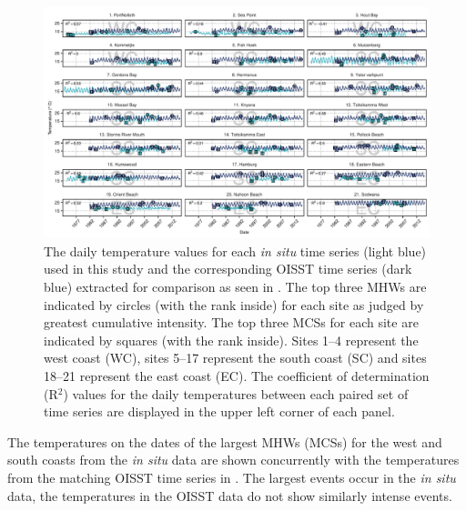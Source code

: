 \documentclass[a4paper,10pt,review]{elsarticle}
\begin{document}
\begin{figure}
\centering
\includegraphics[width=1.0\textwidth]{figure2.pdf}
\caption{The daily temperature values for each \emph{in situ} time series (light blue) used in this study and the corresponding OISST time series (dark blue) extracted for comparison as seen in . The top three MHWs are indicated by circles (with the rank inside) for each site as judged by greatest cumulative intensity. The top three MCSs for each site are indicated by squares (with the rank inside). Sites 1--4 represent the west coast (WC), sites 5--17 represent the south coast (SC) and sites 18--21 represent the east coast (EC). The coefficient of determination (R$^2$) values for the daily temperatures between each paired set of time series are displayed in the upper left corner of each panel.}
\label{fig:Figure2}
\end{figure}

The temperatures on the dates of the largest MHWs (MCSs) for the west and south coasts from the \emph{in situ} data are shown concurrently with the temperatures from the matching OISST time series in . The largest events occur in the \emph{in situ} data, the temperatures in the OISST data do not show similarly intense events.
\end{document}
